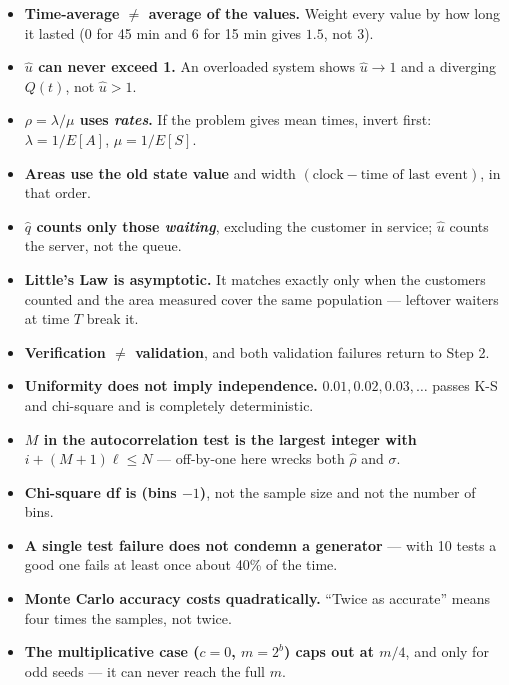 \begin{trapbox}
\begin{itemize}
\item \textbf{Time-average $\ne$ average of the values.} Weight every value by how long it lasted (0 for 45 min and 6 for 15 min gives $1.5$, not $3$).
\item \textbf{$\hat u$ can never exceed 1.} An overloaded system shows $\hat u \to 1$ and a diverging $Q(t)$, not $\hat u > 1$.
\item \textbf{$\rho = \lambda/\mu$ uses \emph{rates}.} If the problem gives mean times, invert first: $\lambda = 1/E[A]$, $\mu = 1/E[S]$.
\item \textbf{Areas use the old state value} and width $(\text{clock}-\text{time of last event})$, in that order.
\item \textbf{$\hat q$ counts only those \emph{waiting}}, excluding the customer in service; $\hat u$ counts the server, not the queue.
\item \textbf{Little's Law is asymptotic.} It matches exactly only when the customers counted and the area measured cover the same population --- leftover waiters at time $T$ break it.
\item \textbf{Verification $\ne$ validation}, and both validation failures return to Step 2.
\item \textbf{Uniformity does not imply independence.} $0.01, 0.02, 0.03,\dots$ passes K-S and chi-square and is completely deterministic.
\item \textbf{$M$ in the autocorrelation test is the largest integer with $i+(M+1)\ell \le N$} --- off-by-one here wrecks both $\hat\rho$ and $\sigma$.
\item \textbf{Chi-square df is (bins $-1$)}, not the sample size and not the number of bins.
\item \textbf{A single test failure does not condemn a generator} --- with 10 tests a good one fails at least once about 40\% of the time.
\item \textbf{Monte Carlo accuracy costs quadratically.} ``Twice as accurate'' means four times the samples, not twice.
\item \textbf{The multiplicative case ($c=0$, $m=2^b$) caps out at $m/4$}, and only for odd seeds --- it can never reach the full $m$.
\end{itemize}
\end{trapbox}
